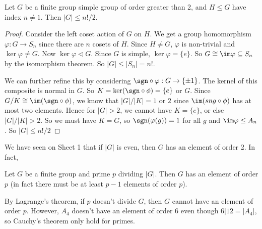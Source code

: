 \documentclass[a4paper]{article}
\begin{document}
\begin{eg}
  Let $G$ be a finite group simple group of order greater than 2, and $H\leq G$ have index $n\not= 1$. Then $|G| \leq n!/2$.
\end{eg}

\begin{proof}
  Consider the left coset action of $G$ on $H$. We get a group homomorphism $\varphi: G\to S_n$ since there are $n$ cosets of $H$. Since $H\not= G$, $\varphi$ is non-trivial and $\ker \varphi \not=G$. Now $\ker \varphi \lhd G$. Since $G$ is simple, $\ker\varphi = \{e\}$. So $G\cong \im \varphi \subseteq S_n$ by the isomorphism theorem. So $|G| \leq |S_n| = n!$.

  We can further refine this by considering $\sgn\circ \varphi: G \to \{\pm 1\}$. The kernel of this composite is normal in $G$. So $K = \ker(\sgn\circ\phi) = \{e\}$ or $G$. Since $G/K\cong \im (\sgn\circ\phi)$, we know that $|G|/|K| = 1$ or $2$ since $\im(sng\circ \phi)$ has at most two elements. Hence for $|G|> 2$, we cannot have $K = \{e\}$, or else $|G|/|K| > 2$. So we must have $K = G$, so $\sgn(\varphi(g)) = 1$ for all $g$ and $\im \varphi \leq A_n$. So $|G|\leq n!/2$
\end{proof}

We have seen on Sheet 1 that if $|G|$ is even, then $G$ has an element of order 2. In fact,
\begin{thm}
  Let $G$ be a finite group and prime $p$ dividing $|G|$. Then $G$ has an element of order $p$ (in fact there must be at least $p - 1$ elements of order $p$).

  \note By Lagrange's theorem, if $p$ doesn't divide $G$, then $G$ cannot have an element of order $p$. However, $A_4$ doesn't have an element of order $6$ even though $6 | 12 = |A_4|$, so Cauchy's theorem only hold for primes.
\end{thm}
\end{document}
